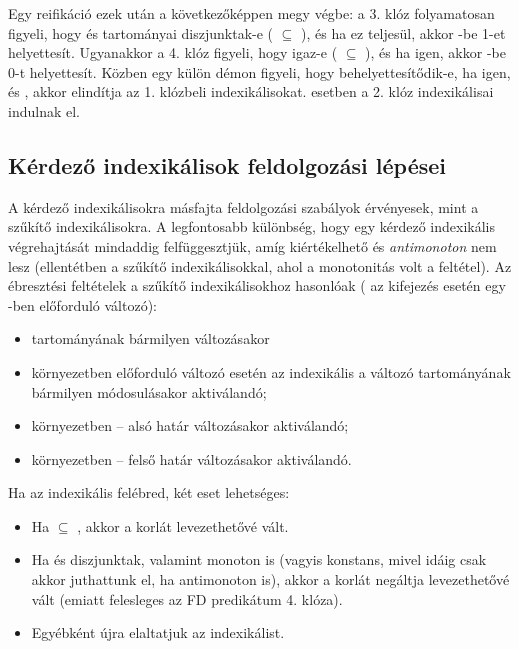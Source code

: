 Egy  reifikáció ezek után a következőképpen megy végbe: a
3. klóz folyamatosan figyeli, hogy  és  tartományai diszjunktak-e
( $\subseteq$ ), és ha ez teljesül, akkor -be
1-et helyettesít. Ugyanakkor a 4. klóz figyeli, hogy  igaz-e (
$\subseteq$ ), és ha igen, akkor -be 0-t helyettesít. Közben
egy külön démon figyeli, hogy  behelyettesítődik-e, ha igen, és ,
akkor elindítja az 1. klózbeli indexikálisokat.  esetben a 2. klóz
indexikálisai indulnak el.

\subsection{Kérdező indexikálisok feldolgozási lépései}

A kérdező indexikálisokra másfajta feldolgozási szabályok érvényesek, mint a
szűkítő indexikálisokra. A legfontosabb különbség, hogy egy kérdező indexikális
végrehajtását mindaddig felfüggesztjük, amíg kiértékelhető és \emph{antimonoton}
nem lesz (ellentétben a szűkítő indexikálisokkal, ahol a monotonitás volt a
feltétel). Az ébresztési feltételek a szűkítő indexikálisokhoz hasonlóak
( az  kifejezés esetén egy -ben előforduló változó):

\begin{itemize}
	\item {} tartományának bármilyen változásakor
        \item {} környezetben előforduló  változó esetén az
        indexikális a változó tartományának bármilyen módosulásakor
        aktiválandó;
        \item {} környezetben -- alsó határ változásakor
        aktiválandó;
         \item
         környezetben -- felső határ változásakor aktiválandó.
\end{itemize}

Ha az indexikális felébred, két eset lehetséges:

\begin{itemize}
        \item Ha  $\subseteq$ , akkor a korlát levezethetővé vált.
        \item Ha   és  diszjunktak, valamint
         monoton is (vagyis konstans, mivel idáig csak akkor juthattunk el,
	ha antimonoton is), akkor a korlát negáltja levezethetővé vált (emiatt
        felesleges az  FD predikátum 4. klóza).
	\item Egyébként újra elaltatjuk az indexikálist.
\end{itemize}

